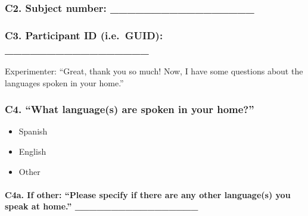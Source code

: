 \documentclass[
  12pt,
]{book}
\providecommand{\tightlist}{%
  \setlength{\itemsep}{0pt}\setlength{\parskip}{0pt}}
\begin{document}
\hypertarget{c2.-subject-number-_________________}{%
\subsubsection*{C2. Subject number: \_\_\_\_\_\_\_\_\_\_\_\_\_\_\_\_\_}\label{c2.-subject-number-_________________}}

\hypertarget{c3.-participant-id-i.e.-guid-_________________}{%
\subsubsection*{C3. Participant ID (i.e.~GUID): \_\_\_\_\_\_\_\_\_\_\_\_\_\_\_\_\_}\label{c3.-participant-id-i.e.-guid-_________________}}

Experimenter: ``Great, thank you so much! Now, I have some questions about the languages spoken in your home.''

\hypertarget{c4.-what-languages-are-spoken-in-your-home}{%
\subsubsection*{C4. ``What language(s) are spoken in your home?''}\label{c4.-what-languages-are-spoken-in-your-home}}

\begin{itemize}
\tightlist
\item
  Spanish
\item
  English
\item
  Other
\end{itemize}

\hypertarget{c4a.-if-other-please-specify-if-there-are-any-other-languages-you-speak-at-home.-_________________}{%
\paragraph*{C4a. If other: ``Please specify if there are any other language(s) you speak at home.'' \_\_\_\_\_\_\_\_\_\_\_\_\_\_\_\_\_}\label{c4a.-if-other-please-specify-if-there-are-any-other-languages-you-speak-at-home.-_________________}}
\end{document}
